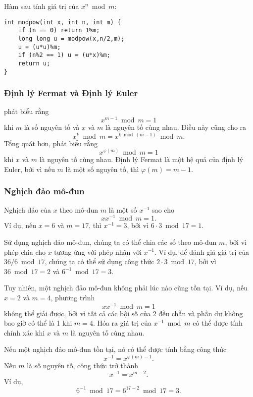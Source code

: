Hàm sau tính giá trị của
$x^n \bmod m$:

\begin{lstlisting}
int modpow(int x, int n, int m) {
    if (n == 0) return 1%m;
    long long u = modpow(x,n/2,m);
    u = (u*u)%m;
    if (n%2 == 1) u = (u*x)%m;
    return u;
}
\end{lstlisting}

\subsubsection{Định lý Fermat và Định lý Euler}


phát biểu rằng
\[x^{m-1} \bmod m = 1\]
khi $m$ là số nguyên tố và $x$ và $m$ là nguyên tố cùng nhau.
Điều này cũng cho ra
\[x^k \bmod m = x^{k \bmod (m-1)} \bmod m.\]
Tổng quát hơn, 
phát biểu rằng
\[x^{\varphi(m)} \bmod m = 1\]
khi $x$ và $m$ là nguyên tố cùng nhau.
Định lý Fermat là một hệ quả của định lý Euler,
bởi vì nếu $m$ là một số nguyên tố, thì $\varphi(m)=m-1$.

\subsubsection{Nghịch đảo mô-đun}


Nghịch đảo của $x$ theo mô-đun $m$
là một số $x^{-1}$ sao cho
\[ x x^{-1} \bmod m = 1. \]
Ví dụ, nếu $x=6$ và $m=17$,
thì $x^{-1}=3$, bởi vì $6\cdot3 \bmod 17=1$.

Sử dụng nghịch đảo mô-đun, chúng ta có thể chia các số
theo mô-đun $m$, bởi vì phép chia cho $x$
tương ứng với phép nhân với $x^{-1}$.
Ví dụ, để đánh giá giá trị của $36/6 \bmod 17$,
chúng ta có thể sử dụng công thức $2 \cdot 3 \bmod 17$,
bởi vì $36 \bmod 17 = 2$ và $6^{-1} \bmod 17 = 3$.

Tuy nhiên, một nghịch đảo mô-đun không phải lúc nào cũng tồn tại.
Ví dụ, nếu $x=2$ và $m=4$, phương trình
\[ x x^{-1} \bmod m = 1 \]
không thể giải được, bởi vì tất cả các bội số của 2
đều chẵn và phần dư không bao giờ có thể là 1 khi $m=4$.
Hóa ra giá trị của $x^{-1} \bmod m$
có thể được tính chính xác khi $x$ và $m$ là nguyên tố cùng nhau.

Nếu một nghịch đảo mô-đun tồn tại, nó có thể được
tính bằng công thức
\[
x^{-1} = x^{\varphi(m)-1}.
\]
Nếu $m$ là số nguyên tố, công thức trở thành
\[
x^{-1} = x^{m-2}.
\]
Ví dụ,
\[6^{-1} \bmod 17 =6^{17-2} \bmod 17 = 3.\]


